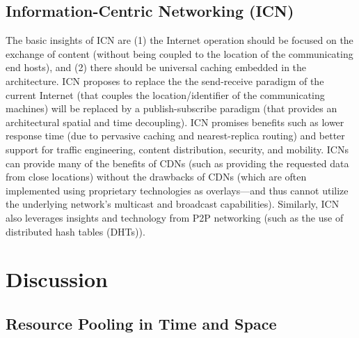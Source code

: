 \documentclass{sigcomm-alternate}
\begin{document}
\subsection{Information-Centric Networking (ICN)}

The basic insights of ICN are (1) the Internet operation should be focused on the exchange of content (without being coupled to the location of the communicating end hosts), and (2) there should be universal caching embedded in the architecture. ICN proposes to replace the the send-receive paradigm of the current Internet (that couples the location/identifier of the communicating machines) will be replaced by a publish-subscribe paradigm (that provides an architectural spatial and time decoupling). ICN promises benefits such as lower response time (due to pervasive caching and nearest-replica routing) and better support for traffic engineering, content distribution, security, and mobility. ICNs can provide many of the benefits of CDNs (such as providing the requested data from close locations) without the drawbacks of CDNs (which are often implemented using proprietary technologies as overlays---and thus cannot utilize the underlying network's multicast and broadcast capabilities).  Similarly, ICN also leverages insights and technology from P2P networking (such as the use of distributed hash tables (DHTs)). 









\section{Discussion}
\label{sec:discussion}

\subsection{Resource Pooling in Time and Space}
\end{document}
